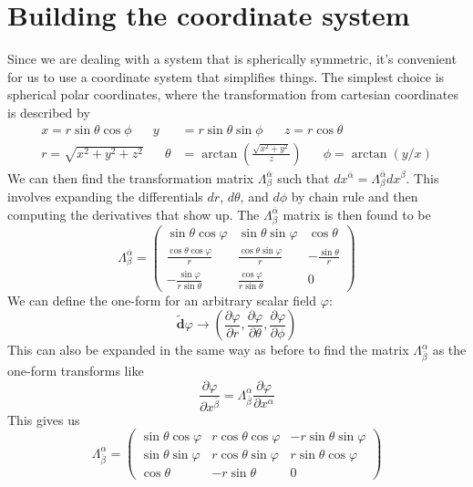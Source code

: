 \documentclass[11pt]{article}
\numberwithin{equation}{section}
\numberwithin{figure}{section}
\numberwithin{table}{section}
\begin{document}
\section{Building the coordinate system}\label{sec:coordinates}
\par Since we are dealing with a system that is spherically symmetric, it's convenient for us to use a coordinate system that simplifies things. The simplest choice is spherical polar coordinates, where the transformation from cartesian coordinates is described by 
\begin{align}
    x=r\sin\theta\cos\phi\hspace{20pt}y&=r\sin\theta\sin\phi\hspace{20pt}z=r\cos\theta
    \label{eqn:cartesian to spherical polars}\\
    r=\sqrt{x^2+y^2+z^2}\hspace{20pt}\theta&=\arctan(\frac{\sqrt{x^2+y^2}}{z})\hspace{20pt}\phi=\arctan(y/x)
    \label{eqn:spherical polars to cartesian}
\end{align}
We can then find the transformation matrix $\Lambda_\beta^{\bar\alpha}$ such that $dx^{\bar\alpha}=\Lambda^{\bar\alpha}_\beta dx^\beta$. This involves expanding the differentials $dr$, $d\theta$, and $d\phi$ by chain rule and then computing the derivatives that show up. The $\Lambda_\beta^{\bar\alpha}$ matrix is then found to be
\begin{equation}
    \Lambda_\beta^{\bar\alpha}=
    \begin{pmatrix}
        \sin\theta\cos\varphi&\sin\theta\sin\varphi&\cos\theta\\
        \frac{\cos\theta\cos\varphi}{r}&\frac{\cos\theta\sin\varphi}{r}&-\frac{\sin\theta}{r}\\
        -\frac{\sin\varphi}{r\sin\theta}&\frac{\cos\varphi}{r\sin\theta}&0
    \end{pmatrix}
\end{equation}
We can define the one-form for an arbitrary scalar field $\varphi$:
\begin{equation}
    \tilde{\textbf{d}}\varphi\rightarrow\left(\frac{\partial\varphi}{\partial r},\frac{\partial\varphi}{\partial\theta},\frac{\partial\varphi}{\partial\phi}\right)
    \label{eqn:scalar one-form}
\end{equation}
This can also be expanded in the same way as before to find the matrix $\Lambda_{\bar\beta}^\alpha$ as the one-form transforms like 
\begin{equation*}
    \frac{\partial\varphi}{\partial x^{\bar\beta}}=\Lambda_{\bar\beta}^\alpha\frac{\partial\varphi}{\partial x^\alpha}
\end{equation*}
This gives us
\begin{equation}
    \Lambda_{\bar\beta}^\alpha=
    \begin{pmatrix}
        \sin\theta\cos\varphi&r\cos\theta\cos\varphi&-r\sin\theta\sin\varphi\\
        \sin\theta\sin\varphi&r\cos\theta\sin\varphi&r\sin\theta\cos\varphi\\
        \cos\theta&-r\sin\theta&0
    \end{pmatrix}
\end{equation}
\end{document}
